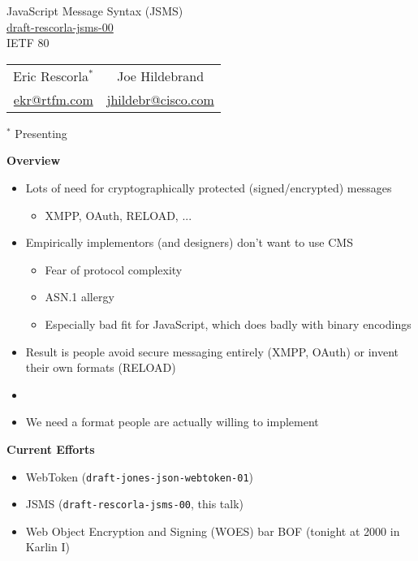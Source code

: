 \documentclass[helvetica]{seminar}
\newcommand{\heading}[1]{%
  \begin{center} 
    \large\bf 
    #1 
  \end{center} 
  \vspace{.4 in}}
\begin{document}
\begin{slide}
\begin{center}
\vspace{1 in}
\LARGE{{\bf}JavaScript Message Syntax (JSMS)}\\
\vspace{.2in}
\large{\url{draft-rescorla-jsms-00}}\\
\large{{IETF 80}} \\
\vspace{3em}
\large{
\begin{tabular}{cc}
Eric Rescorla$^*$ & Joe Hildebrand \\
\url{ekr@rtfm.com} & \url{jhildebr@cisco.com} \\
\end{tabular}
}
\end{center}

\vspace{1in}
$^*$ Presenting
\end{slide}


\centerslidesfalse 


\begin{slide}
\heading{Overview}

\vspace{-.3in}
\begin{itemize}
\item Lots of need for cryptographically protected (signed/encrypted) messages
  \begin{itemize}
  \item XMPP, OAuth, RELOAD, ...
  \end{itemize}
\item Empirically implementors (and designers) don't want to use CMS
  \begin{itemize}
  \item Fear of protocol complexity
  \item ASN.1 allergy
  \item Especially bad fit for JavaScript, which does badly with binary encodings
  \end{itemize}
\item Result is people avoid secure messaging entirely (XMPP, OAuth) or invent their own formats (RELOAD)
\item[]
\item We need a format people are actually willing to implement
\end{itemize}
\end{slide}


\begin{slide}
\heading{Current Efforts}

\begin{itemize}
\item WebToken (\texttt{draft-jones-json-webtoken-01})
\item JSMS (\texttt{draft-rescorla-jsms-00}, this talk)
\item Web Object Encryption and Signing (WOES) bar BOF (tonight at 2000 in Karlin I)
\end{itemize}
\end{slide}
\end{document}
